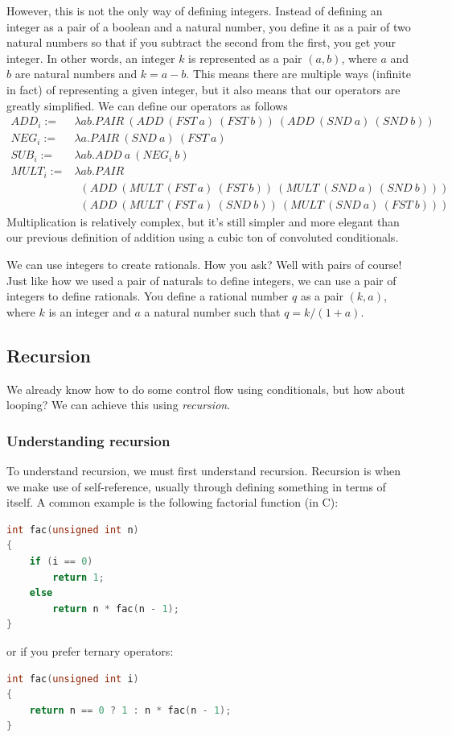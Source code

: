 \documentclass[11pt]{article}
\begin{document}
However, this is not the only way of defining integers. Instead of defining an
integer as a pair of a boolean and a natural number, you define it as a pair of
two natural numbers so that if you subtract the second from the first, you get
your integer. In other words, an integer \(k\) is represented as a pair
\((a,b)\), where \(a\) and \(b\) are natural numbers and \(k=a-b\). This means
there are multiple ways (infinite in fact) of representing a given integer, but
it also means that our operators are greatly simplified. We can define our
operators as follows
\begin{align*}
	ADD_i:=&\lambda ab.PAIR\ (ADD\ (FST\ a)\ (FST\ b))\ (ADD\ (SND\ a)\ (SND\ b))\\
	NEG_i:=&\lambda a.PAIR\ (SND\ a)\ (FST\ a)\\
	SUB_i:=&\lambda ab.ADD\ a\ (NEG_i\ b)\\
	MULT_i:=&\lambda ab.PAIR\\
		&\enspace(ADD\ (MULT\ (FST\ a)\ (FST\ b))\ (MULT\ (SND\ a)\ (SND\ b)))\\
		&\enspace(ADD\ (MULT\ (FST\ a)\ (SND\ b))\ (MULT\ (SND\ a)\ (FST\ b)))
\end{align*}
Multiplication is relatively complex, but it's still simpler and more elegant
than our previous definition of addition using a cubic ton of convoluted
conditionals.

We can use integers to create rationals. How you ask? Well with pairs of
course! Just like how we used a pair of naturals to define integers, we can use
a pair of integers to define rationals. You define a rational number \(q\) as a
pair \((k,a)\), where \(k\) is an integer and \(a\) a natural number such that
\(q=k/(1+a)\).


\subsection{Recursion}\label{recursion}


We already know how to do some control flow using conditionals, but how about
looping? We can achieve this using \emph{recursion}.

\subsubsection{Understanding recursion}

To understand recursion, we must first understand recursion. Recursion is when
we make use of self-reference, usually through defining something in terms of
itself. A common example is the following factorial function (in C):
\begin{lstlisting}[language=C]
int fac(unsigned int n)
{
	if (i == 0)
		return 1;
	else
		return n * fac(n - 1);
}
\end{lstlisting}
or if you prefer ternary operators:
\begin{lstlisting}[language=C]
int fac(unsigned int i)
{
	return n == 0 ? 1 : n * fac(n - 1);
}
\end{lstlisting}
\end{document}

